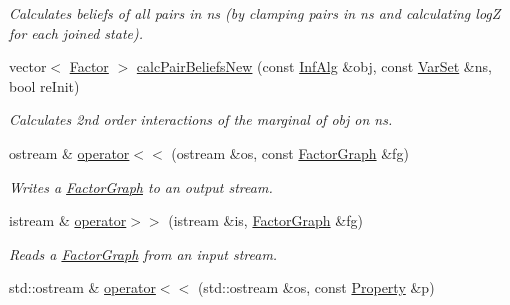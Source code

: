 \begin{CompactItemize}
\begin{CompactList}\small\item\em Calculates beliefs of all pairs in ns (by clamping pairs in ns and calculating logZ for each joined state). \item\end{CompactList}\item 
\hypertarget{namespacedai_5a70c8cebb3df468779b93704af33a2e}{
vector$<$ \hyperlink{classdai_1_1TFactor}{Factor} $>$ \hyperlink{namespacedai_5a70c8cebb3df468779b93704af33a2e}{calcPairBeliefsNew} (const \hyperlink{classdai_1_1InfAlg}{InfAlg} \&obj, const \hyperlink{classdai_1_1VarSet}{VarSet} \&ns, bool reInit)}
\label{namespacedai_5a70c8cebb3df468779b93704af33a2e}

\begin{CompactList}\small\item\em Calculates 2nd order interactions of the marginal of obj on ns. \item\end{CompactList}\item 
\hypertarget{namespacedai_5142341b00644dce3b6f982cc6d283c0}{
ostream \& \hyperlink{namespacedai_5142341b00644dce3b6f982cc6d283c0}{operator$<$$<$} (ostream \&os, const \hyperlink{classdai_1_1FactorGraph}{FactorGraph} \&fg)}
\label{namespacedai_5142341b00644dce3b6f982cc6d283c0}

\begin{CompactList}\small\item\em Writes a \hyperlink{classdai_1_1FactorGraph}{FactorGraph} to an output stream. \item\end{CompactList}\item 
\hypertarget{namespacedai_9d1623757eae10cc61ff92dcd98b7290}{
istream \& \hyperlink{namespacedai_9d1623757eae10cc61ff92dcd98b7290}{operator$>$$>$} (istream \&is, \hyperlink{classdai_1_1FactorGraph}{FactorGraph} \&fg)}
\label{namespacedai_9d1623757eae10cc61ff92dcd98b7290}

\begin{CompactList}\small\item\em Reads a \hyperlink{classdai_1_1FactorGraph}{FactorGraph} from an input stream. \item\end{CompactList}\item 
\hypertarget{namespacedai_c63c2f1d67d01aeda5c3cdd95843ea86}{
std::ostream \& \hyperlink{namespacedai_c63c2f1d67d01aeda5c3cdd95843ea86}{operator$<$$<$} (std::ostream \&os, const \hyperlink{namespacedai_cbc670414e04eecf5c284e42d9d036e3}{Property} \&p)}
\label{namespacedai_c63c2f1d67d01aeda5c3cdd95843ea86}


\end{CompactItemize}
